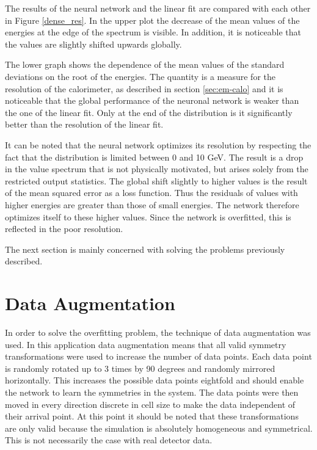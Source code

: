 \documentclass[12pt, a4paper]{thesis}
\begin{document}
The results of the neural network and the linear fit are compared with each
other in Figure \ref{dense_res}. In the upper plot the decrease of the mean values
of the energies at the edge of the spectrum is visible. In addition, it is
noticeable that the values are slightly shifted upwards globally.

The lower graph shows the dependence of the mean values of the
standard deviations on the root of the energies. The quantity is a
measure for the resolution of the calorimeter, as described in section
\ref{sec:em-calo} and it is noticeable that the global performance of
the neuronal network is weaker than the one of the linear fit. Only at
the end of the distribution is it significantly better than the
resolution of the linear fit.

It can be noted that the neural network optimizes its resolution by
respecting the fact that the distribution is limited between 0 and 10
GeV. The result is a drop in the value spectrum that is not physically
motivated, but arises solely from the restricted output statistics.
The global shift slightly to higher values is the result of the mean
squared error as a loss function. Thus the residuals of values with
higher energies are greater than those of small energies. The network
therefore optimizes itself to these higher values. Since the network
is overfitted, this is reflected in the poor resolution.

The next section is mainly concerned with solving the problems previously
described.

\section{Data Augmentation}
\label{sec:org4a347fb}

In order to solve the overfitting problem, the technique of data
augmentation was used. In this application data augmentation means
that all valid symmetry transformations were used to increase the
number of data points. Each data point is randomly rotated up to 3
times by 90 degrees and randomly mirrored horizontally. This increases
the possible data points eightfold and should enable the network to
learn the symmetries in the system. The data points were then moved in
every direction discrete in cell size to make the data independent of
their arrival point. At this point it should be noted that these
transformations are only valid because the simulation is absolutely
homogeneous and symmetrical. This is not necessarily the case with
real detector data.
\end{document}

